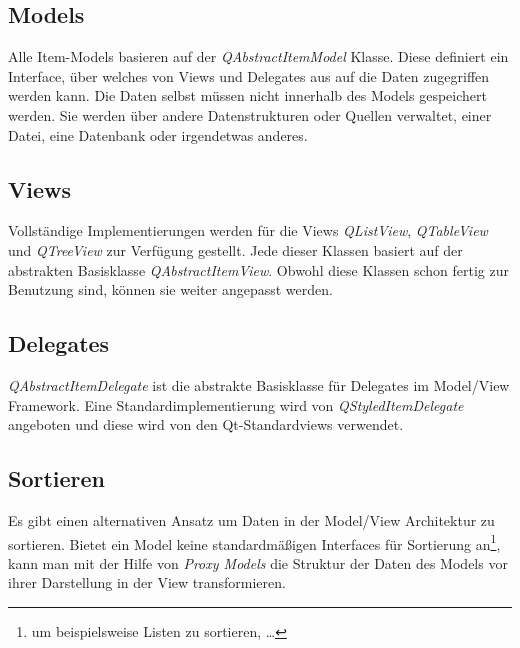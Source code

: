 \documentclass[11pt,a4paper,titlepage]{scrreprt}
\begin{document}
\subsection{Models}
Alle Item-Models basieren auf der {\itshape QAbstractItemModel} Klasse. Diese definiert ein
Interface, über welches von Views und Delegates aus auf die Daten zugegriffen werden kann.
Die Daten selbst müssen nicht innerhalb des Models gespeichert werden. Sie werden über andere
Datenstrukturen oder Quellen verwaltet, einer Datei, eine Datenbank oder irgendetwas anderes.

\subsection{Views}
Vollständige Implementierungen werden für die Views {\itshape QListView}, {\itshape QTableView} und
{\itshape QTreeView} zur Verfügung gestellt. Jede dieser Klassen basiert auf der abstrakten
Basisklasse {\itshape QAbstractItemView}. Obwohl diese Klassen schon fertig zur Benutzung sind,
können sie weiter angepasst werden.

\subsection{Delegates}
{\itshape QAbstractItemDelegate} ist die abstrakte Basisklasse für Delegates im Model/View
Framework. Eine Standardimplementierung wird von {\itshape QStyledItemDelegate} angeboten und
diese wird von den Qt-Standardviews verwendet.

\subsection{Sortieren}
Es gibt einen alternativen Ansatz um Daten in der Model/View Architektur zu sortieren. Bietet
ein Model keine standardmäßigen Interfaces für Sortierung an\footnote{um beispielsweise Listen
zu sortieren, \dots}, kann man mit der Hilfe von {\itshape Proxy Models} die Struktur der Daten
des Models vor ihrer Darstellung in der View transformieren.

\newpage
\nocite{*}
{}

\end{document}
